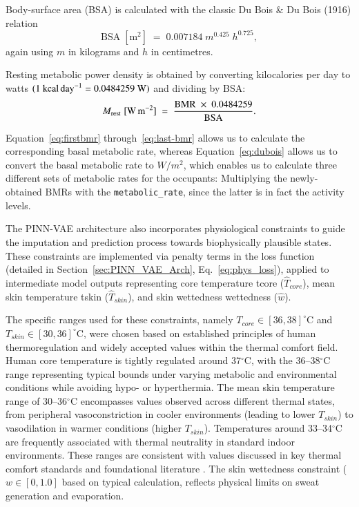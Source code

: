 Body-surface area (BSA) is calculated with the classic Du Bois \& Du Bois (1916) relation
\begin{equation}
    \mathrm{BSA}\;[\text{m}^2] \;=\; 0.007184 \;
            m^{0.425}\;
            h^{0.725},
\end{equation}\label{eq:last-bmr}
again using \(m\) in kilograms and \(h\) in centimetres.

Resting metabolic power density is obtained by converting kilocalories per day to watts
\((1\ \text{kcal\,day}^{-1}=0.0484259\ \text{W})\) and dividing by BSA:
\begin{equation}
    M_{\mathrm{rest}}\;[\text{W\,m}^{-2}] \;=\;
    \frac{\mathrm{BMR}\;\times\;0.0484259}{\mathrm{BSA}}.
\end{equation}\label{eq:dubois}

Equation~\ref{eq:firstbmr} through~\ref{eq:last-bmr} allows us to calculate the corresponding basal metabolic rate, whereas Equation~\ref{eq:dubois} allows us to convert the basal metabolic rate to $W/m^2$\cite{DuBois1916}, which enables us to calculate three different sets of metabolic rates for the occupants: Multiplying the newly-obtained BMRs with the \texttt{metabolic\_rate}, since the latter is in fact the activity levels.

The PINN-VAE architecture also incorporates physiological constraints to guide the imputation and prediction process towards biophysically plausible states. These constraints are implemented via penalty terms in the loss function (detailed in Section~\ref{sec:PINN_VAE_Arch}, Eq.~\ref{eq:phys_loss}), applied to intermediate model outputs representing core temperature \gls{tcore} ($\hat{T}_{core}$), mean skin temperature \gls{tskin} ($\hat{T}_{skin}$), and skin wettedness \gls{wettedness} ($\hat{w}$).

The specific ranges used for these constraints, namely $T_{core} \in [36, 38]^{\circ}\text{C}$ and $T_{skin} \in [30, 36]^{\circ}\text{C}$, were chosen based on established principles of human thermoregulation and widely accepted values within the thermal comfort field. Human core temperature is tightly regulated around 37$^{\circ}$C, with the 36–38$^{\circ}$C range representing typical bounds under varying metabolic and environmental conditions while avoiding hypo- or hyperthermia. The mean skin temperature range of 30–36$^{\circ}$C encompasses values observed across different thermal states, from peripheral vasoconstriction in cooler environments (leading to lower $T_{skin}$) to vasodilation in warmer conditions (higher $T_{skin}$). Temperatures around 33–34$^{\circ}$C are frequently associated with thermal neutrality in standard indoor environments. These ranges are consistent with values discussed in key thermal comfort standards and foundational literature \cite{ASHRAE55,Fanger1970,gagge1986standard}. The skin wettedness constraint ($w \in [0, 1.0]$ based on typical calculation, reflects physical limits on sweat generation and evaporation. %

